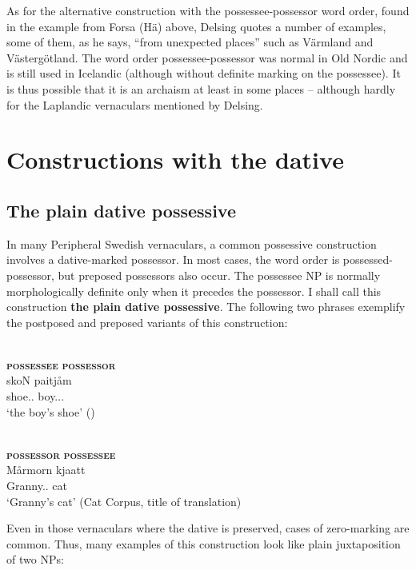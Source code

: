 As for the alternative construction with the possessee-possessor word order, found in the example from Forsa (Hä) above, Delsing quotes a number of examples, some of them, as he says, “from unexpected places” such as Värmland and Västergötland. The word order possessee-possessor was normal in Old Nordic and is still used in Icelandic (although without definite marking on the possessee). It is thus possible that it is an archaism at least in some places – although hardly for the Laplandic vernaculars mentioned by Delsing.

\section{Constructions with the dative}
\label{sec:5.4}\subsection{The plain dative possessive}\label{sec:5.4.1}

In many Peripheral Swedish vernaculars, a common possessive construction involves a dative-marked possessor. In most cases, the word order is possessed-possessor, but preposed possessors also occur. The possessee NP is normally morphologically definite only when it precedes the possessor. I shall call this construction \textbf{the plain dative possessive}. The following two phrases exemplify the postposed and preposed variants of this construction:

\renewcommand{\eachwordone}{\scshape}
\renewcommand{\eachwordtwo}{\itshape}

\ea\label{}
	\\
	\glll \textbf{\textsc{possessee}} \textbf{\textsc{possessor}} \\
	skoN  paitjåm  \\
	shoe.{\sg}.{}  boy.{\dat}.{\sg}.{}  \\
	\glt ‘the boy’s shoe’ (\citet[22]{Marklund1976})
\z

\ea\label{}
	\\
	\glll \textbf{\textsc{possessor}} \textbf{\textsc{possessee}} \\
	Mårmorn  kjaatt\\
	Granny.{}.{\dat}  cat\\
\glt ‘Granny’s cat’ (Cat Corpus, title of translation)
\z

Even in those vernaculars where the dative is preserved, cases of zero-marking are common. Thus, many examples of this construction look like plain juxtaposition of two NPs:

